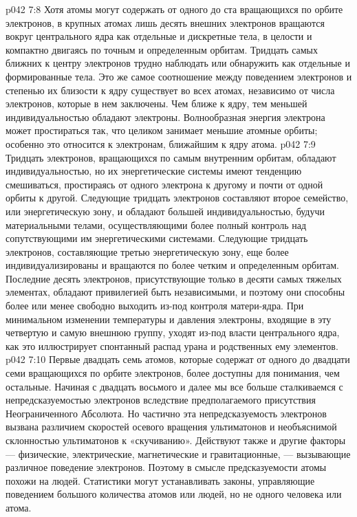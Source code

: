 \vs p042 7:8 \pc Хотя атомы могут содержать от одного до ста вращающихся по орбите электронов, в крупных атомах лишь десять внешних электронов вращаются вокруг центрального ядра как отдельные и дискретные тела, в целости и компактно двигаясь по точным и определенным орбитам. Тридцать самых ближних к центру электронов трудно наблюдать или обнаружить как отдельные и формированные тела. Это же самое соотношение между поведением электронов и степенью их близости к ядру существует во всех атомах, независимо от числа электронов, которые в нем заключены. Чем ближе к ядру, тем меньшей индивидуальностью обладают электроны. Волнообразная энергия электрона может простираться так, что целиком занимает меньшие атомные орбиты; особенно это относится к электронам, ближайшим к ядру атома.
\vs p042 7:9 Тридцать электронов, вращающихся по самым внутренним орбитам, обладают индивидуальностью, но их энергетические системы имеют тенденцию смешиваться, простираясь от одного электрона к другому и почти от одной орбиты к другой. Следующие тридцать электронов составляют второе семейство, или энергетическую зону, и обладают большей индивидуальностью, будучи материальными телами, осуществляющими более полный контроль над сопутствующими им энергетическими системами. Следующие тридцать электронов, составляющие третью энергетическую зону, еще более индивидуализированы и вращаются по более четким и определенным орбитам. Последние десять электронов, присутствующие только в десяти самых тяжелых элементах, обладают привилегией быть независимыми, и поэтому они способны более или менее свободно выходить из\hyp{}под контроля матери\hyp{}ядра. При минимальном изменении температуры и давления электроны, входящие в эту четвертую и самую внешнюю группу, уходят из\hyp{}под власти центрального ядра, как это иллюстрирует спонтанный распад урана и родственных ему элементов.
\vs p042 7:10 Первые двадцать семь атомов, которые содержат от одного до двадцати семи вращающихся по орбите электронов, более доступны для понимания, чем остальные. Начиная с двадцать восьмого и далее мы все больше сталкиваемся с непредсказуемостью электронов вследствие предполагаемого присутствия Неограниченного Абсолюта. Но частично эта непредсказуемость электронов вызвана различием скоростей осевого вращения ультиматонов и необъяснимой склонностью ультиматонов к «скучиванию». Действуют также и другие факторы --- физические, электрические, магнетические и гравитационные, --- вызывающие различное поведение электронов. Поэтому в смысле предсказуемости атомы похожи на людей. Статистики могут устанавливать законы, управляющие поведением большого количества атомов или людей, но не одного человека или атома.
